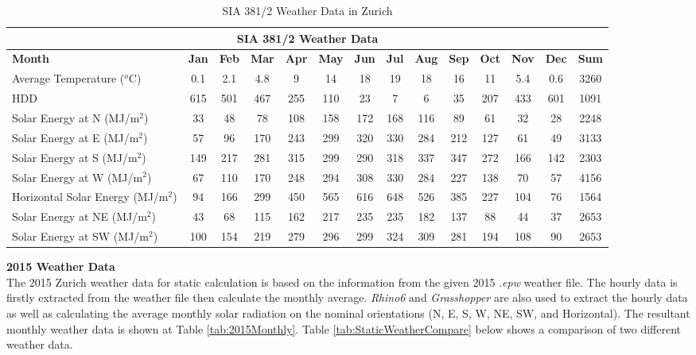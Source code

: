 \documentclass[a4paper, oneside]{discothesis}
\begin{document}
		\begin{table}[H]
		  \centering
		  \small
		\caption{SIA 381/2 Weather Data in Zurich}
		    \begin{tabular}{|p{4.5em}|c|c|c|c|c|c|c|c|c|c|c|c|c|}
		    \toprule
		    \multicolumn{14}{|c|}{SIA 381/2 Weather Data} \\
		    \midrule
		    \textbf{Month} & \textbf{Jan} & \textbf{Feb} & \textbf{Mar} & \textbf{Apr} & \textbf{May} & \textbf{Jun} & \textbf{Jul} & \textbf{Aug} & \textbf{Sep} & \textbf{Oct} & \textbf{Nov} & \textbf{Dec} & \textbf{Sum} \\
		    \midrule
		    Average Temperature ($^o$C) & 0.1  & 2.1  & 4.8  & 9    & 14   & 18   & 19   & 18   & 16   & 11   & 5.4  & 0.6  & 3260 \\
		    \midrule
		    HDD  & 615  & 501  & 467  & 255  & 110  & 23   & 7    & 6    & 35   & 207  & 433  & 601  & 1091 \\
		    \midrule
		    Solar Energy at N (MJ/m$^2$) & 33   & 48   & 78   & 108  & 158  & 172  & 168  & 116  & 89   & 61   & 32   & 28   & 2248 \\
		    \midrule
		    Solar Energy at E (MJ/m$^2$) & 57   & 96   & 170  & 243  & 299  & 320  & 330  & 284  & 212  & 127  & 61   & 49   & 3133 \\
		    \midrule
		    Solar Energy at S (MJ/m$^2$) & 149  & 217  & 281  & 315  & 299  & 290  & 318  & 337  & 347  & 272  & 166  & 142  & 2303 \\
		    \midrule
		    Solar Energy at W (MJ/m$^2$) & 67   & 110  & 170  & 248  & 294  & 308  & 330  & 284  & 227  & 138  & 70   & 57   & 4156 \\
		    \midrule
		    Horizontal Solar Energy (MJ/m$^2$)& 94   & 166  & 299  & 450  & 565  & 616  & 648  & 526  & 385  & 227  & 104  & 76   & 1564 \\
		    \midrule
		    Solar Energy at NE (MJ/m$^2$)& 43   & 68   & 115  & 162  & 217  & 235  & 235  & 182  & 137  & 88   & 44   & 37   & 2653 \\
		    \midrule
		    Solar Energy at SW (MJ/m$^2$)& 100  & 154  & 219  & 279  & 296  & 299  & 324  & 309  & 281  & 194  & 108  & 90   & 2653 \\
		    \bottomrule
		    \end{tabular}%
		  \label{tab:WeatherSIA3812}%
		\end{table}%



			\textbf{2015 Weather Data}\\
				The 2015 Zurich weather data for static calculation is based on the information from the given 2015 .\textit{epw} weather file. The hourly data is firstly extracted from the weather file then calculate the monthly average. \textit{Rhino6} and \textit{Grasshopper} are also used to extract the hourly data as well as calculating the average monthly solar radiation on the nominal orientations (N, E, S, W, NE, SW, and Horizontal). The resultant monthly weather data is shown at Table \ref{tab:2015Monthly}. Table \ref{tab:StaticWeatherCompare} below shows a comparison of two different weather data.
				
\end{document}
